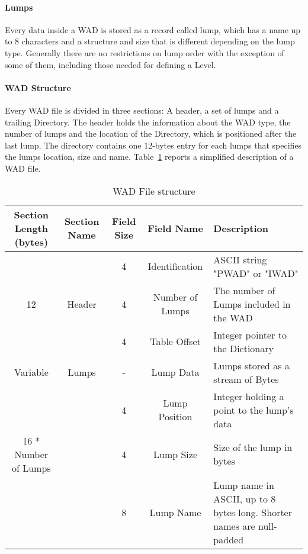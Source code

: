 \paragraph{Lumps} Every data inside a \gls{WAD} is stored as a record called \gls{lump}, which has a name up to 8 characters and a structure and size that is different depending on the lump type. Generally there are no restrictions on lump order with the exception of some of them, including those needed for defining a Level.

\paragraph{WAD Structure} Every \gls{WAD} file is divided in three sections: A header, a set of \glspl{lump} and a trailing Directory. The header holds the information about the WAD type, the number of \glspl{lump} and the location of the Directory, which is positioned after the last \gls{lump}. The directory contains one 12-bytes entry for each \glspl{lump} that specifies the \glspl{lump} location, size and name. Table~\ref{tab:WADStructure} reports a simplified description of a \gls{WAD} file.



\begin{table}[b]
	\centering
	\begin{tabularx}{\textwidth}{| c | c | c | c | X | }
		\hline
		Section Length (bytes) & Section Name & Field Size & Field Name & Description \\
		\hline
		   &   & 4 & Identification & ASCII string "PWAD" or "IWAD" \\ \cline{3-5}
		12 &     Header			  & 4 & Number of Lumps & The number of Lumps included in the WAD \\  \cline{3-5}
		&   						  & 4 & Table Offset & Integer pointer to the Dictionary \\ \cline{3-5}
		\hline
		Variable& Lumps & - & Lump Data & Lumps stored as a stream of Bytes \\
		\hline
		&                              & 4 & Lump Position & Integer holding a point to the lump's data \\ \cline{3-5}
		16 * Number of Lumps  & \multirow{3}{*}{}{Directory} & 4 & Lump Size & Size of the lump in bytes \\ \cline{3-5}
		&                              & 8 & Lump Name & Lump name in ASCII, up to 8 bytes long. Shorter names are null-padded \\ \cline{3-5}
		\hline
	\end{tabularx}
\caption{WAD File structure}
\label{tab:WADStructure}
\end{table}

